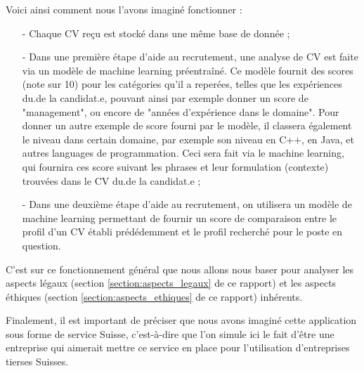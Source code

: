 Voici ainsi comment nous l'avons imaginé fonctionner : 

\begin{enumerate}
    \item[-] Chaque CV reçu est stocké dans une même base de donnée ;
    \item[-] Dans une première étape d'aide au recrutement, une analyse de CV est faite via un modèle de machine learning préentraîné. Ce modèle fournit des scores (note sur 10) pour les catégories qu'il a reperées, telles que les expériences du.de la candidat.e, pouvant ainsi par exemple donner un score de "management", ou encore de "années d'expérience dans le domaine". Pour donner un autre exemple de score fourni par le modèle, il classera également le niveau dans certain domaine, par exemple son niveau en C++, en Java, et autres languages de programmation. Ceci sera fait via le machine learning, qui fournira ces score suivant les phrases et leur formulation (contexte) trouvées dans le CV du.de la candidat.e ;
    \item[-] Dans une deuxième étape d'aide au recrutement, on utilisera un modèle de machine learning permettant de fournir un score de comparaison entre le profil d'un CV établi prédédemment et le profil recherché pour le poste en question.
\end{enumerate}

C'est sur ce fonctionnement général que nous allons nous baser pour analyser les aspects légaux (section \ref{section:aspects_legaux} de ce rapport) et les aspects éthiques (section \ref{section:aspects_ethiques} de ce rapport) inhérents.\newline

Finalement, il est important de préciser que nous avons imaginé cette application sous forme de service Suisse, c'est-à-dire que l'on simule ici le fait d'être une entreprise qui aimerait mettre ce service en place pour l'utilisation d'entreprises tierses Suisses.
